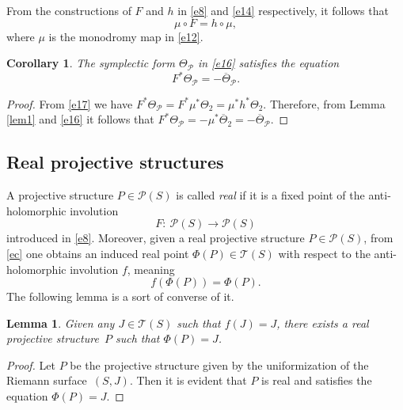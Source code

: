 \documentclass[pdftex]{sigma}
\numberwithin{equation}{section}
\newtheorem{Corollary}[Theorem]{Corollary}
\newtheorem{Lemma}[Theorem]{Lemma}
\begin{document}
\begin{Remark}From the constructions of $F$ and $h$ in \eqref{e8} and \eqref{e14} respectively, it follows that
\begin{equation}\label{e17}
\mu \circ F = h\circ\mu,
\end{equation}
where $\mu$ is the monodromy map in \eqref{e12}.\end{Remark}

\begin{Corollary}\label{cor1}
The symplectic form $\Theta_{\mathcal P}$ in \eqref{e16} satisfies the equation
\[
F^*\Theta_{\mathcal P} = -\overline{\Theta}_{\mathcal P}.
\]
\end{Corollary}

\begin{proof}
{}From \eqref{e17} we have $F^*\Theta_{\mathcal P} = F^*\mu^*\Theta_2 = \mu^*h^*
\Theta_2$. Therefore, from Lemma \ref{lem1} and \eqref{e16} it follows that $F^*
\Theta_{\mathcal P} = -\mu^*\overline{\Theta}_2 = -\overline{\Theta}_{\mathcal P}$.
\end{proof}

\subsection{Real projective structures}

A projective structure $P \in {\mathcal P}(S)$ is called \textit{real} if it is a fixed point of the anti-holomorphic involution
\[F\colon\ {\mathcal P}(S) \longrightarrow {\mathcal P}(S)\]
introduced in \eqref{e8}. Moreover, given a real projective structure $P \in {\mathcal P}(S)$, from \eqref{ec} one obtains an
induced real point $\Phi(P) \in {\mathcal T}(S)$ with respect to the anti-holomorphic involution $f$, meaning
\[
f(\Phi(P)) = \Phi(P).
\]
The following lemma is a sort of converse of it.

\begin{Lemma}\label{lem2}
Given any $J \in {\mathcal T}(S)$ such that $f(J) = J$, there exists a real projective structure~$P$
such that $\Phi(P) = J$.
\end{Lemma}

\begin{proof}
Let $P$ be the projective structure given by the uniformization of the Riemann surface~$(S, J)$. Then it
is evident that $P$ is real and satisfies the equation $\Phi(P) = J$.
\end{proof}
\end{document}
